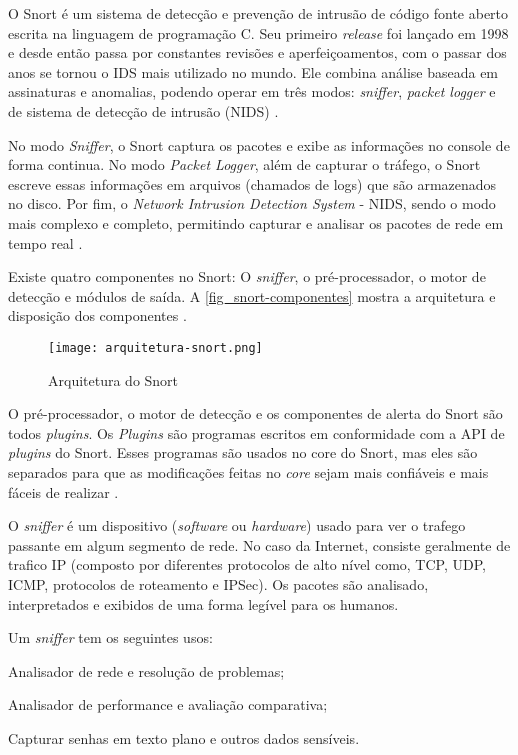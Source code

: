 O Snort é um sistema de detecção e prevenção de intrusão de código fonte aberto escrita na linguagem de programação C. Seu primeiro \textit{release} foi lançado em 1998 e desde então passa por constantes revisões e aperfeiçoamentos, com o passar dos anos se tornou o IDS mais utilizado no mundo. Ele combina análise baseada em assinaturas e anomalias, podendo operar em três modos: \textit{sniffer}, \textit{packet logger} e de sistema de detecção de intrusão (NIDS) \cite{snort:manual}.

No modo \textit{Sniffer}, o Snort captura os pacotes e exibe as informações no console de forma continua. No modo \textit{Packet Logger}, além de capturar o tráfego, o Snort escreve essas informações em arquivos (chamados de logs) que são armazenados no disco. Por fim, o \textit{Network Intrusion Detection System} - NIDS, sendo o modo mais complexo e completo, permitindo capturar e analisar os pacotes de rede em tempo real \cite{snort:manual}.

Existe quatro componentes no Snort: O \textit{sniffer}, o pré-processador, o motor de detecção e módulos de saída. A \autoref{fig_snort-componentes} mostra a arquitetura e disposição dos componentes \cite{snort:andrew}.

\begin{figure}[!htb]
  \centering
  \caption{Arquitetura do Snort} \label{fig_snort-componentes}
  \texttt{[image: arquitetura-snort.png]}
\end{figure}

O pré-processador, o motor de detecção e os componentes de alerta do Snort são todos \textit{plugins}. Os \textit{Plugins} são programas escritos em conformidade com a API de \textit{plugins} do Snort. Esses programas são usados no core do Snort, mas eles são separados para que as modificações feitas no \textit{core} sejam mais confiáveis e mais fáceis de realizar \cite{snort:andrew}.

O \textit{sniffer} é um dispositivo (\textit{software} ou \textit{hardware}) usado para ver o trafego passante em algum segmento de rede. No caso da Internet, consiste geralmente de trafico IP (composto por diferentes protocolos de alto nível como, TCP, UDP, ICMP, protocolos de roteamento e IPSec). Os pacotes são analisado, interpretados e exibidos de uma forma legível para os humanos.

Um \textit{sniffer} tem os seguintes usos:

\begin{alineas}
\item Analisador de rede e resolução de problemas;
\item Analisador de performance e avaliação comparativa;
\item Capturar senhas em texto plano e outros dados sensíveis.
\end{alineas}

